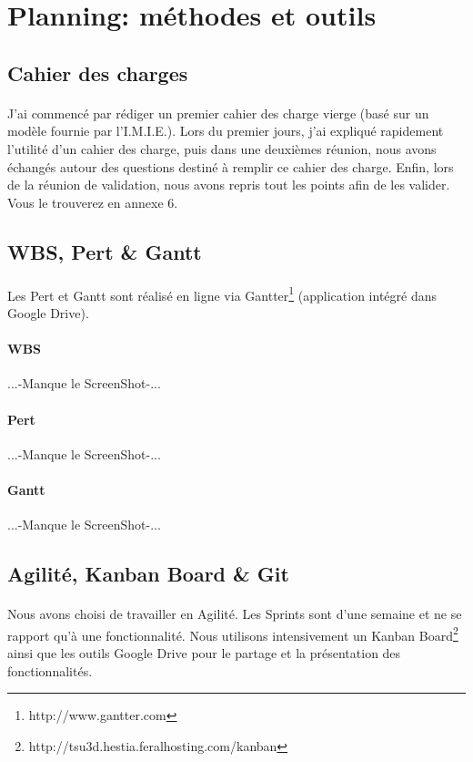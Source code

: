 \documentclass[11pt,a4paper]{report}
\begin{document}
	\section{Planning: méthodes et outils}
		\subsection{Cahier des charges}
			\paragraph*{}J'ai commencé par rédiger un premier cahier des charge vierge (basé sur un modèle fournie par l'I.M.I.E.). Lors du premier jours, j'ai expliqué rapidement l'utilité d'un cahier des charge, puis dans une deuxièmes réunion, nous avons échangés autour des questions destiné à remplir ce cahier des charge. Enfin, lors de la réunion de validation, nous avons repris tout les points afin de les valider. Vous le trouverez en annexe 6.
		\subsection{WBS, Pert \& Gantt}
			\paragraph*{}Les Pert et Gantt sont réalisé en ligne via Gantter\footnote{http://www.gantter.com} (application intégré dans Google Drive).
			\paragraph*{WBS}...-Manque le ScreenShot-...
			\paragraph*{Pert}...-Manque le ScreenShot-...
			\paragraph*{Gantt}...-Manque le ScreenShot-...
		\subsection{Agilité, Kanban Board \& Git}
			\paragraph*{}Nous avons choisi de travailler en Agilité. Les Sprints sont d'une semaine et ne se rapport qu'à une fonctionnalité. Nous utilisons intensivement un Kanban Board\footnote{http://tsu3d.hestia.feralhosting.com/kanban} ainsi que les outils Google Drive pour le partage et la présentation des fonctionnalités.
\end{document}
